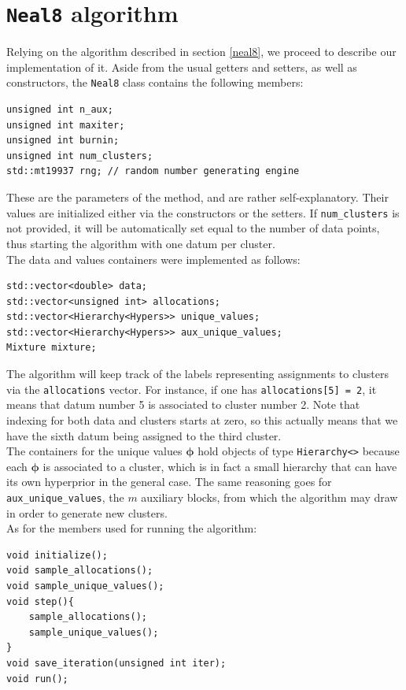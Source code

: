 \section{\texttt{Neal8} algorithm}
Relying on the algorithm described in section \ref{neal8}, we proceed to describe our implementation of it.
Aside from the usual getters and setters, as well as constructors, the \verb|Neal8| class contains the following members:
\begin{verbatim}
unsigned int n_aux;
unsigned int maxiter;
unsigned int burnin;
unsigned int num_clusters;
std::mt19937 rng; // random number generating engine
\end{verbatim}
These are the parameters of the method, and are rather self-explanatory.
Their values are initialized either via the constructors or the setters.
If \verb|num_clusters| is not provided, it will be automatically set equal to the number of data points, thus starting the algorithm with one datum per cluster. \\
The data and values containers were implemented as follows:
\begin{verbatim}
std::vector<double> data;
std::vector<unsigned int> allocations;
std::vector<Hierarchy<Hypers>> unique_values;
std::vector<Hierarchy<Hypers>> aux_unique_values;
Mixture mixture;
\end{verbatim}
The algorithm will keep track of the labels representing assignments to clusters via the \verb|allocations| vector.
For instance, if one has \verb|allocations[5] = 2|, it means that datum number 5 is associated to cluster number 2.
Note that indexing for both data and clusters starts at zero, so this actually means that we have the sixth datum being assigned to the third cluster. \\
The containers for the unique values $\boldsymbol\phi$ hold objects of type \verb|Hierarchy<>| because each $\boldsymbol\phi$ is associated to a cluster, which is in fact a small hierarchy that can have its own hyperprior in the general case.
The same reasoning goes for \verb|aux_unique_values|, the $m$ auxiliary blocks, from which the algorithm may draw in order to generate new clusters. \\
As for the members used for running the algorithm:
\begin{verbatim}
void initialize();
void sample_allocations();
void sample_unique_values();
void step(){
    sample_allocations();
    sample_unique_values();
}
void save_iteration(unsigned int iter);
void run();
\end{verbatim}
